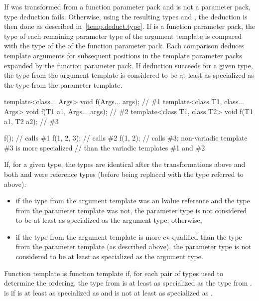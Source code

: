 \pnum
If  was transformed from a function parameter pack and
 is not a parameter pack,
type deduction fails.
Otherwise, using the resulting types  and ,
the deduction is then done as described in~\ref{temp.deduct.type}.
If  is a function parameter pack, the type  of each remaining
parameter type of the argument template is compared with the type  of
the  of the function parameter pack. Each comparison
deduces template arguments for subsequent positions in the template parameter
packs expanded by the function parameter pack.
If deduction succeeds for a given type,
the type from the argument template is considered to be at least as specialized
as the type from the parameter template.
\begin{example}
\begin{codeblock}
template<class... Args>           void f(Args... args);         // \#1
template<class T1, class... Args> void f(T1 a1, Args... args);  // \#2
template<class T1, class T2>      void f(T1 a1, T2 a2);         // \#3

f();                // calls \#1
f(1, 2, 3);         // calls \#2
f(1, 2);            // calls \#3; non-variadic template \#3 is more specialized
                    // than the variadic templates \#1 and \#2
\end{codeblock}
\end{example}

\pnum
If, for a given type, the
types are identical after the transformations above
and both  and  were reference types (before being replaced with the
type referred to above):
\begin{itemize}
\item if the type from the argument template was an lvalue reference and the type
from the parameter template was not,
the parameter type is not considered to be
at least as specialized as the argument type; otherwise,
\item if the type from
the argument template is more cv-qualified than the type from the
parameter template (as described above),
the parameter type is not considered to be
at least as specialized as the argument type.
\end{itemize}

\pnum
{}%
Function template 
is 
function template  if,
for each pair of types used to determine the ordering,
the type from 
is at least as specialized as
the type from .
is 
 if
is at least as specialized as
 and
is not at least as specialized as
.

